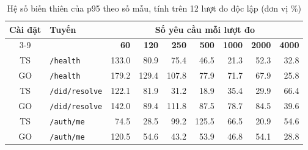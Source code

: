 \begin{table}[H]
\centering
\caption{Hệ số biến thiên của p95 theo số mẫu, tính trên 12 lượt đo độc lập (đơn vị \%)}
\label{tab:bench-samplesize}
\renewcommand{\arraystretch}{1.2}
\footnotesize
\begin{tabular}{|c|l|r|r|r|r|r|r|r|}
\hline
\multirow{2}{*}{\textbf{Cài đặt}} & \multirow{2}{*}{\textbf{Tuyến}} & \multicolumn{7}{c|}{\textbf{Số yêu cầu mỗi lượt đo}} \\
\cline{3-9}
 & & \textbf{60} & \textbf{120} & \textbf{250} & \textbf{500} & \textbf{1000} & \textbf{2000} & \textbf{4000} \\
\hline
TS & \texttt{/health} & 133.0 & 80.9 & 75.4 & 46.5 & 21.3 & 52.3 & 32.8 \\
GO & \texttt{/health} & 179.2 & 129.4 & 107.8 & 77.9 & 71.7 & 67.9 & 25.8 \\
TS & \texttt{/did/resolve} & 122.1 & 81.9 & 31.2 & 18.9 & 35.4 & 29.9 & 66.4 \\
GO & \texttt{/did/resolve} & 142.0 & 89.4 & 111.8 & 87.5 & 78.7 & 84.5 & 39.6 \\
TS & \texttt{/auth/me} & 74.5 & 28.5 & 99.2 & 125.5 & 66.5 & 20.9 & 54.6 \\
GO & \texttt{/auth/me} & 120.5 & 54.6 & 43.2 & 53.9 & 46.8 & 54.1 & 28.8 \\
\hline
\end{tabular}
\end{table}
